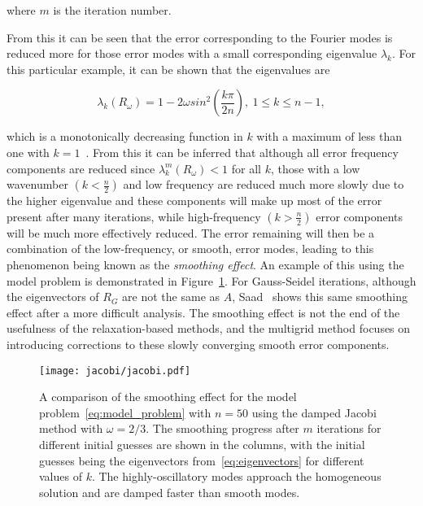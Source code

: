 where $m$ is the iteration number.

From this it can be seen that the error corresponding to the Fourier modes is reduced more for those error modes with a small corresponding eigenvalue $\lambda_k$. For this particular example, it can be shown that the eigenvalues are

\begin{equation}
	\lambda_k(R_{\omega}) = 1 - 2\omega sin^2\left(\frac{k\pi}{2n}\right),\ 1 \leq k \leq n-1,
\end{equation}

which is a monotonically decreasing function in $k$ with a maximum of less than one with $k = 1$~\cite{Briggs2000}. From this it can be inferred that although all error frequency components are reduced since $\lambda_k^m(R_{\omega}) < 1$ for all $k$, those with a low wavenumber $\left(k < \frac{n}{2}\right)$ and low frequency are reduced much more slowly due to the higher eigenvalue and these components will make up most of the error present after many iterations, while high-frequency $\left(k > \frac{n}{2}\right)$ error components will be much more effectively reduced. The error remaining will then be a combination of the low-frequency, or smooth, error modes, leading to this phenomenon being known as the \emph{smoothing effect}. An example of this using the model problem is demonstrated in Figure~\ref{fig:smoothing}. For Gauss-Seidel iterations, although the eigenvectors of $R_G$ are not the same as $A$, Saad~\cite{Saad2003} shows this same smoothing effect after a more difficult analysis. The smoothing effect is not the end of the usefulness of the relaxation-based methods, and the multigrid method focuses on introducing corrections to these slowly converging smooth error components.

\begin{figure}[h]
	\centering
	\texttt{[image: jacobi/jacobi.pdf]}
	\caption{A comparison of the smoothing effect for the model problem~\ref{eq:model_problem} with $n = 50$ using the damped Jacobi method with $\omega = 2/3$. The smoothing progress after $m$ iterations for different initial guesses are shown in the columns, with the initial guesses being the eigenvectors from~\ref{eq:eigenvectors} for different values of $k$. The highly-oscillatory modes approach the homogeneous solution and are damped faster than smooth modes.}
	\label{fig:smoothing}
\end{figure}

\clearpage

